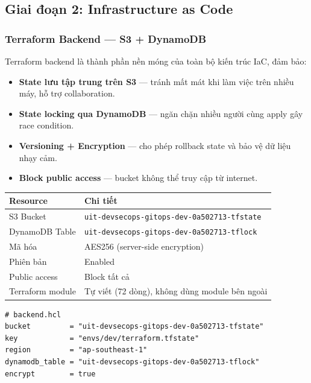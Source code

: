 \documentclass[12pt,a4paper]{article}
\begin{document}
\subsection{Giai đoạn 2: Infrastructure as Code}

\subsubsection{Terraform Backend — S3 + DynamoDB}

Terraform backend là thành phần nền móng của toàn bộ kiến trúc IaC, đảm bảo:

\begin{itemize}[leftmargin=*,nosep]
  \item \textbf{State lưu tập trung trên S3} — tránh mất mát khi làm việc trên nhiều máy, hỗ trợ collaboration.
  \item \textbf{State locking qua DynamoDB} — ngăn chặn nhiều người cùng apply gây race condition.
  \item \textbf{Versioning + Encryption} — cho phép rollback state và bảo vệ dữ liệu nhạy cảm.
  \item \textbf{Block public access} — bucket không thể truy cập từ internet.
\end{itemize}

\begin{table}[H]
\centering
\begin{tabular}{@{}ll@{}}
\toprule
\textbf{Resource}         & \textbf{Chi tiết} \\
\midrule
S3 Bucket                 & \texttt{uit-devsecops-gitops-dev-0a502713-tfstate} \\
DynamoDB Table            & \texttt{uit-devsecops-gitops-dev-0a502713-tflock} \\
Mã hóa                    & AES256 (server-side encryption) \\
Phiên bản                 & Enabled \\
Public access             & Block tất cả \\
Terraform module          & Tự viết (72 dòng), không dùng module bên ngoài \\
\bottomrule
\end{tabular}
\end{table}

\begin{lstlisting}[caption={Cấu hình backend cho môi trường dev},label={lst:backend}]
# backend.hcl
bucket         = "uit-devsecops-gitops-dev-0a502713-tfstate"
key            = "envs/dev/terraform.tfstate"
region         = "ap-southeast-1"
dynamodb_table = "uit-devsecops-gitops-dev-0a502713-tflock"
encrypt        = true
\end{lstlisting}
\end{document}
